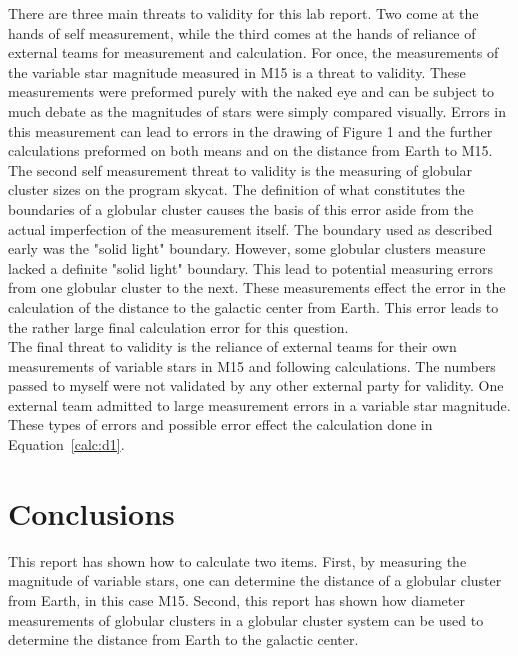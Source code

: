 \documentclass{article}
\begin{document}
There are three main threats to validity for this lab report. Two come at the hands
of self measurement, while the third comes at the hands of reliance of external
teams for measurement and calculation. For once, the measurements of the variable
star magnitude measured in M15 is a threat to validity. These measurements were preformed
purely with the naked eye and can be subject to much debate as the magnitudes of
stars were simply compared visually. Errors in this measurement can lead to errors
in the drawing of Figure 1 and the further calculations preformed on both means and
on the distance from Earth to M15. \\

The second self measurement threat to validity is the measuring of globular cluster
sizes on the program skycat. The definition of what constitutes the boundaries of a
globular cluster causes the basis of this error aside from the actual imperfection
of the measurement itself. The boundary used as described early was the "solid light"
boundary. However, some globular clusters measure lacked a definite "solid light"
boundary. This lead to potential measuring errors from one globular cluster to the
next. These measurements effect the error in the calculation of the distance to
the galactic center from Earth. This error leads to the rather large final calculation
error for this question. \\

The final threat to validity is the reliance of external teams for their own measurements
of variable stars in M15 and following calculations. The numbers passed to myself
were not validated by any other external party for validity. One external team
admitted to large measurement errors in a variable star magnitude. These types of errors
and possible error effect the calculation done in Equation~\ref{calc:d1}.




\section{Conclusions}

This report has shown how to calculate two items. First, by measuring the magnitude of
variable stars, one can determine the distance of a globular cluster from Earth,
in this case M15. Second, this report has shown how diameter measurements of globular
clusters in a globular cluster system can be used to determine the distance from
Earth to the galactic center.
\end{document}
